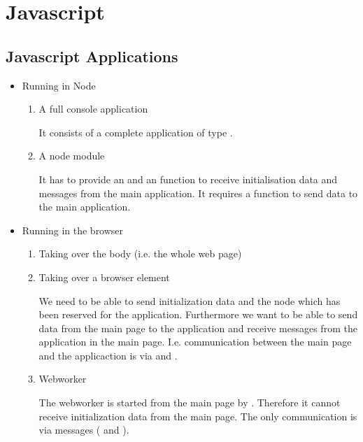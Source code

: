 \chapter{Javascript}


\section{Javascript Applications}

\begin{itemize}

\item Running in Node

    \begin{enumerate}

    \item A full console application

    It consists of a complete application of type .

    \item A node module

    It has to provide an  and an  function to receive
    initialisation data and messages from the main application. It requires a
     function to send data to the main application.

    \end{enumerate}

\item Running in the browser

    \begin{enumerate}

    \item Taking over the body (i.e. the whole web page)

    \item Taking over a browser element

    We need to be able to send initialization data and the node which has been
    reserved for the application. Furthermore we want to be able to send data
    from the main page to the application and receive messages from the
    application in the main page. I.e. communication between the main page and
    the applicaction is via  and .

    \item Webworker

    The webworker is started from the main page by . Therefore it cannot receive initialization data from the main
    page. The only communication is via messages ( and
    ).

    \end{enumerate}

\end{itemize}


